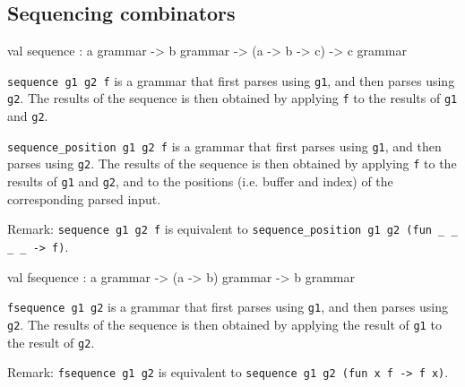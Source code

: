 \documentclass[11pt]{article}
\begin{document}
\subsection{Sequencing combinators}




\label{val:Earley.sequence}\begin{ocamldoccode}
val sequence : {\textquotesingle}a grammar ->
  {\textquotesingle}b grammar -> ({\textquotesingle}a -> {\textquotesingle}b -> {\textquotesingle}c) -> {\textquotesingle}c grammar
\end{ocamldoccode}
\begin{ocamldocdescription}
{\tt{sequence g1 g2 f}} is a grammar that first parses using {\tt{g1}}, and then
    parses using {\tt{g2}}. The results of the sequence is then obtained by applying
    {\tt{f}} to the results of {\tt{g1}} and {\tt{g2}}.


\end{ocamldocdescription}




{\tt{sequence\_position g1 g2 f}} is a grammar that first parses using {\tt{g1}}, and
    then parses using {\tt{g2}}. The results of the sequence is then obtained by
    applying {\tt{f}} to the results of {\tt{g1}} and {\tt{g2}}, and to the positions (i.e.
    buffer and index) of the corresponding parsed input.


    Remark: {\tt{sequence g1 g2 f}} is equivalent to
    {\tt{sequence\_position g1 g2 (fun \_ \_ \_ \_ -> f)}}.



\label{val:Earley.fsequence}\begin{ocamldoccode}
val fsequence : {\textquotesingle}a grammar -> ({\textquotesingle}a -> {\textquotesingle}b) grammar -> {\textquotesingle}b grammar
\end{ocamldoccode}
\begin{ocamldocdescription}
{\tt{fsequence g1 g2}} is a grammar that first parses using {\tt{g1}}, and then
    parses using {\tt{g2}}. The results of the sequence is then obtained by applying
    the result of {\tt{g1}} to the result of {\tt{g2}}.


    Remark: {\tt{fsequence g1 g2}} is equivalent to
    {\tt{sequence g1 g2 (fun x f -> f x)}}.


\end{ocamldocdescription}
\end{document}
